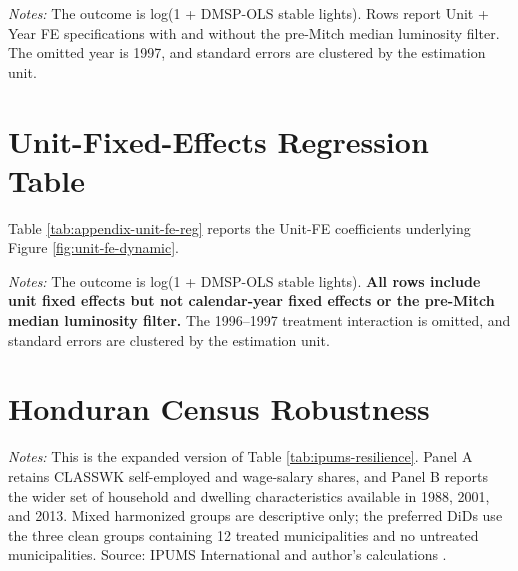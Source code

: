 \documentclass[12pt]{article}
\newcommand{\tablenotes}[1]{\vspace{0.3em}\begin{minipage}{0.92\linewidth}\footnotesize\emph{Notes:} #1\end{minipage}}
\begin{document}
\begin{table}[p]
\centering
\caption{\label{tab:appendix-annual-reg}Annual coefficients for the main treatment definitions}
\begingroup
\scriptsize
\setlength{\tabcolsep}{2pt}
\resizebox{\linewidth}{!}{%

}
\endgroup
\tablenotes{The outcome is log(1 + DMSP-OLS stable lights). Rows report Unit + Year FE specifications with and without the pre-Mitch median luminosity filter. The omitted year is 1997, and standard errors are clustered by the estimation unit.}
\end{table}

\section{Unit-Fixed-Effects Regression Table}
Table \ref{tab:appendix-unit-fe-reg} reports the Unit-FE coefficients underlying Figure \ref{fig:unit-fe-dynamic}.

\begin{table}[p]
\centering
\caption{\label{tab:appendix-unit-fe-reg}Two-year coefficients with unit fixed effects}
\begingroup
\scriptsize
\setlength{\tabcolsep}{3pt}
\resizebox{\linewidth}{!}{%

}
\endgroup
\tablenotes{The outcome is log(1 + DMSP-OLS stable lights). \textbf{All rows include unit fixed effects but not calendar-year fixed effects or the pre-Mitch median luminosity filter.} The 1996--1997 treatment interaction is omitted, and standard errors are clustered by the estimation unit.}
\end{table}

\section{Honduran Census Robustness}
\begin{table}[p]
\centering
\caption{\label{tab:appendix-ipums-expanded}Expanded population, education, worker type, and dwelling conditions in Honduran 50-knot census groups}
\begingroup
\scriptsize
\setlength{\tabcolsep}{3pt}

\endgroup
\tablenotes{This is the expanded version of Table \ref{tab:ipums-resilience}. Panel A retains CLASSWK self-employed and wage-salary shares, and Panel B reports the wider set of household and dwelling characteristics available in 1988, 2001, and 2013. Mixed harmonized groups are descriptive only; the preferred DiDs use the three clean groups containing 12 treated municipalities and no untreated municipalities. Source: IPUMS International and author's calculations \parencite{ipumsinternational2025}.}
\end{table}
\end{document}
